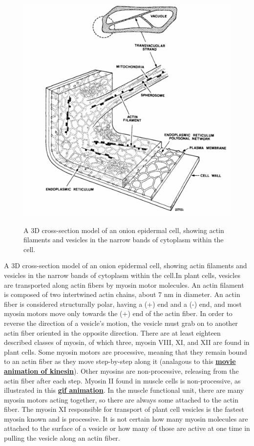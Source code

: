 \documentclass{../lab}
\begin{document}
\begin{figure}[h]
    \centering
    \href{http://experimentationlab.berkeley.edu/sites/default/files/images/500px-BMC_OnionStucture.gif}{\includegraphics[width=0.8\linewidth]{images/500px-BMC_OnionStucture.png}}
    \caption{A 3D cross-section model of an onion epidermal cell, showing actin filaments and vesicles in the narrow bands of cytoplasm within the cell.}
    \label{fig:500px-BMC_OnionStucture}
\end{figure}

A 3D cross-section model of an onion epidermal cell, showing actin filaments and vesicles in the narrow bands of cytoplasm within the cell.In plant cells, vesicles are transported along actin fibers by myosin motor molecules. An actin filament is composed of two intertwined actin chains, about 7 nm in diameter. An actin fiber is considered structurally polar, having a (+) end and a (-) end, and most myosin motors move only towards the (+) end of the actin fiber. In order to reverse the direction of a vesicle's motion, the vesicle must grab on to another actin fiber oriented in the opposite direction. There are at least eighteen described classes of myosin, of which three, myosin VIII, XI, and XII are found in plant cells. Some myosin motors are processive, meaning that they remain bound to an actin fiber as they move step-by-step along it (analagous to this \href{http://experimentationlab.berkeley.edu/sites/default/files/Kinesin_Motion.mp4}{\textbf{movie animation of kinesin}}). Other myosins are non-processive, releasing from the actin fiber after each step. Myosin II found in muscle cells is non-processive, as illustrated in this \href{http://physics111.lib.berkeley.edu/Physics111/Reprints/OTZ/actinmyosin.gif}{\textbf{gif animation}}.  In the muscle functional unit, there are many myosin motors acting together, so there are always some attached to the actin fiber. The myosin XI responsible for transport of plant cell vesicles is the fastest myosin known and is processive. It is not certain how many myosin molecules are attached to the surface of a vesicle or how many of those are active at one time in pulling the vesicle along an actin fiber.
\end{document}
